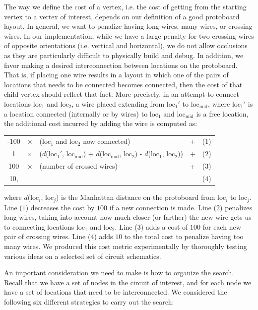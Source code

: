 The way we define the cost of a vertex, i.e. the cost of getting from the
starting vertex to a vertex of interest, depends on our definition of a good
protoboard layout. In general, we want to penalize having
long wires, many wires, or crossing wires. In our implementation, while we have
a large penalty for two crossing wires of opposite orientations (i.e. vertical
and horizontal), we do not allow occlusions as
they are particularly difficult to physically build and debug.
In addition, we favor making a desired interconnection between locations
on the protoboard. That is, if placing one wire results in a layout in which
one of the pairs of locations that needs to be connected becomes connected, then
the cost of that child vertex should reflect that fact. More precisely, in an
attempt to connect locations $\text{loc}_1$ and $\text{loc}_2$, a wire placed extending from
$\text{loc}_1'$ to $\text{loc}_{\text{mid}}$, where $\text{loc}_1'$ is a
location connected (internally or by wires) to
$\text{loc}_1$ and
$\text{loc}_{\text{mid}}$ is a free location, the additional cost
incurred by adding the wire is computed as:
\begin{table}[H]
\centering
\begin{tabular}{ccllr}
-100 &$\times$ & ($\text{loc}_1$ and $\text{loc}_2$ now connected) &+ &($1$)\\
1 &$\times$ & ($d$($\text{loc}_1'$, $\text{loc}_{\text{mid}}$) + $d$($\text{loc}_{\text{mid}}$, $\text{loc}_2$) - $d$($\text{loc}_1$, $\text{loc}_2$)) &+ &($2$)\\
100 &$\times$ & (number of crossed wires) &+ &($3$)\\
10, & & & &($4$)
\end{tabular}
\end{table}
\noindent where $d$($\text{loc}_i$, $\text{loc}_j$) is the Manhattan distance
on the protoboard from $\text{loc}_i$ to $\text{loc}_j$.
Line ($1$) decreases the cost by $100$ if a new connection is
made. Line ($2$) penalizes long wires, taking into account how much closer (or
farther) the new wire gets us to connecting locations $\text{loc}_1$ and
$\text{loc}_2$.
Line ($3$) adds a cost of $100$ for each new pair
of crossing wires. Line ($4$) adds $10$ to the total cost to penalize having
too many wires. We produced this cost metric experimentally by thoroughly
testing various ideas on a selected set of circuit schematics.

An important consideration we need to make is how to organize the
search. Recall that we have a set of nodes in the circuit of interest, and for
each node we have a set of locations that need to be interconnected.
We considered the following six different strategies to carry out the search:

